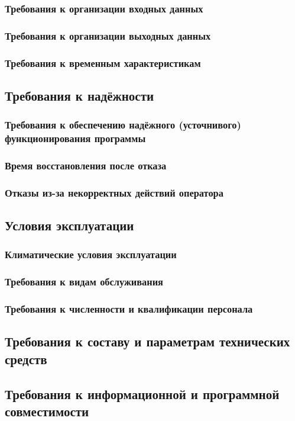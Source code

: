 \documentclass[a4paper,10pt]{article}
\begin{document}
\subsubsection{Требования к организации входных данных}
\subsubsection{Требования к организации выходных данных}
\subsubsection{Требования к временным характеристикам}
\subsection{Требования к надёжности}
\subsubsection{Требования к обеспечению надёжного (усточнивого) функционирования программы}
\subsubsection{Время восстановления после отказа}
\subsubsection{Отказы из-за некорректных действий оператора}
\subsection{Условия эксплуатации}
\subsubsection{Климатические условия эксплуатации}
\subsubsection{Требования к видам обслуживания}
\subsubsection{Требования к численности и квалификации персонала}
\subsection{Требования к составу и параметрам технических средств}
\subsection{Требования к информационной и программной совместимости}
\end{document}
